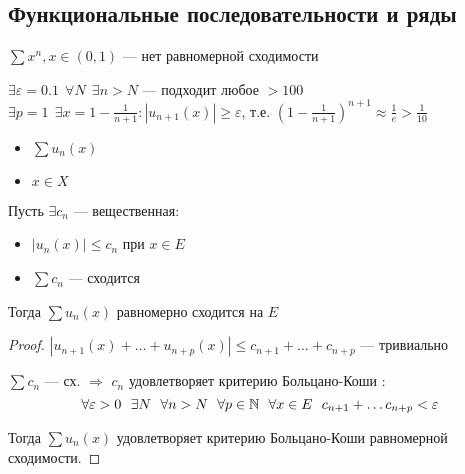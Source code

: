 

\cfoot{}



\subsection*{Функциональные последовательности и ряды}

\begin{example}
    $\sum x^n, x\in (0, 1)$ --- нет равномерной сходимости

    $\exists \varepsilon = 0.1 \ \ \forall N \ \ \exists n>N$ --- подходит любое $>100$ $\exists p = 1 \ \ \exists x = 1 - \frac{1}{n+1} : |u_{n+1}(x)| \ge \varepsilon$, т.е. $\left(1 - \frac{1}{n+1}\right)^{n+1} \approx \frac{1}{e} > \frac{1}{10}$
\end{example}

\begin{theorem}\itemfix
    \begin{itemize}
        \item $\sum u_n(x)$
        \item $x\in X$
    \end{itemize}
    Пусть $\exists c_n$ --- вещественная:
    \begin{itemize}
        \item $|u_n(x)| \le c_n$ при $x\in E$
        \item $\sum c_n$ --- сходится
    \end{itemize}
    Тогда $\sum u_n(x)$ равномерно сходится на $E$
\end{theorem}
\begin{proof}
    $|u_{n+1}(x) + \ldots + u_{n+p}(x)| \le c_{n+1} + \ldots + c_{n+p}$ --- тривиально

    $\sum c_n$ --- сх. $\Rightarrow$ $c_n$ удовлетворяет критерию Больцано-Коши : $$\forall \varepsilon > 0 \ \ \exists N \ \ \forall n > N \ \ \forall p\in \N \ \ \forall x\in E \ \ c_{n+1} + \ldots c_{n+p} < \varepsilon$$

    Тогда $\sum u_n(x)$ удовлетворяет критерию Больцано-Коши равномерной сходимости.
\end{proof}

